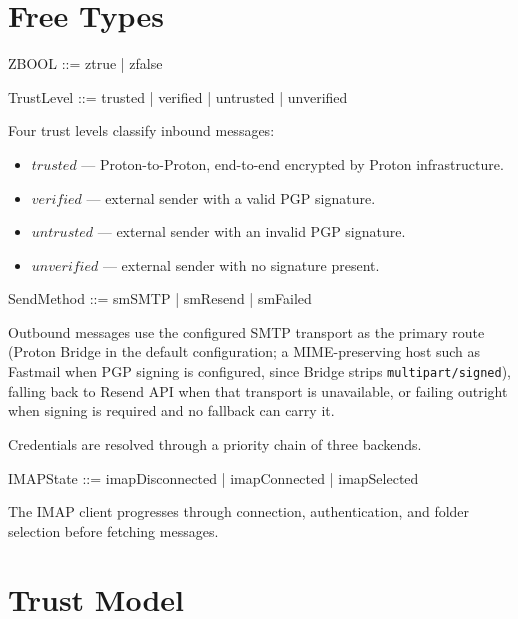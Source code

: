 \documentclass[a4paper,10pt,fleqn]{article}
\begin{document}
\section{Free Types}

\begin{zed}
  ZBOOL ::= ztrue | zfalse
\end{zed}

\begin{zed}
  TrustLevel ::= trusted | verified | untrusted | unverified
\end{zed}

Four trust levels classify inbound messages:

\begin{itemize}
  \item $trusted$ --- Proton-to-Proton, end-to-end encrypted by Proton
    infrastructure.
  \item $verified$ --- external sender with a valid PGP signature.
  \item $untrusted$ --- external sender with an invalid PGP signature.
  \item $unverified$ --- external sender with no signature present.
\end{itemize}

\begin{zed}
  SendMethod ::= smSMTP | smResend | smFailed
\end{zed}

Outbound messages use the configured SMTP transport as the primary
route (Proton Bridge in the default configuration; a MIME-preserving
host such as Fastmail when PGP signing is configured, since Bridge
strips \texttt{multipart/signed}), falling back to Resend API when
that transport is unavailable, or failing outright when signing is
required and no fallback can carry it.

Credentials are resolved through a priority chain of three backends.

\begin{zed}
  IMAPState ::= imapDisconnected | imapConnected | imapSelected
\end{zed}

The IMAP client progresses through connection, authentication, and
folder selection before fetching messages.

\section{Trust Model}
\end{document}
